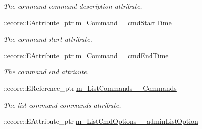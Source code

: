 \begin{DoxyCompactItemize}
\begin{DoxyCompactList}\small\item\em The command command description attribute. \item\end{DoxyCompactList}\item 
\hypertarget{classUMS__Data_1_1UMS__DataPackage_ae22be9f27df57cd74c99cbf7709d0d38}{
::ecore::EAttribute\_\-ptr \hyperlink{classUMS__Data_1_1UMS__DataPackage_ae22be9f27df57cd74c99cbf7709d0d38}{m\_\-Command\_\-\_\-cmdStartTime}}
\label{classUMS__Data_1_1UMS__DataPackage_ae22be9f27df57cd74c99cbf7709d0d38}

\begin{DoxyCompactList}\small\item\em The command start attribute. \item\end{DoxyCompactList}\item 
\hypertarget{classUMS__Data_1_1UMS__DataPackage_abe38c5cb1c2f98cb7548ecc41432dfae}{
::ecore::EAttribute\_\-ptr \hyperlink{classUMS__Data_1_1UMS__DataPackage_abe38c5cb1c2f98cb7548ecc41432dfae}{m\_\-Command\_\-\_\-cmdEndTime}}
\label{classUMS__Data_1_1UMS__DataPackage_abe38c5cb1c2f98cb7548ecc41432dfae}

\begin{DoxyCompactList}\small\item\em The command end attribute. \item\end{DoxyCompactList}\item 
\hypertarget{classUMS__Data_1_1UMS__DataPackage_a96f2ff42938b0b1d0511b3450b44dd5f}{
::ecore::EReference\_\-ptr \hyperlink{classUMS__Data_1_1UMS__DataPackage_a96f2ff42938b0b1d0511b3450b44dd5f}{m\_\-ListCommands\_\-\_\-Commands}}
\label{classUMS__Data_1_1UMS__DataPackage_a96f2ff42938b0b1d0511b3450b44dd5f}

\begin{DoxyCompactList}\small\item\em The list command commands attribute. \item\end{DoxyCompactList}\item 
\hypertarget{classUMS__Data_1_1UMS__DataPackage_a33ce4807b539e36f4b8609aea4330043}{
::ecore::EAttribute\_\-ptr \hyperlink{classUMS__Data_1_1UMS__DataPackage_a33ce4807b539e36f4b8609aea4330043}{m\_\-ListCmdOptions\_\-\_\-adminListOption}}
\label{classUMS__Data_1_1UMS__DataPackage_a33ce4807b539e36f4b8609aea4330043}


\end{DoxyCompactItemize}
